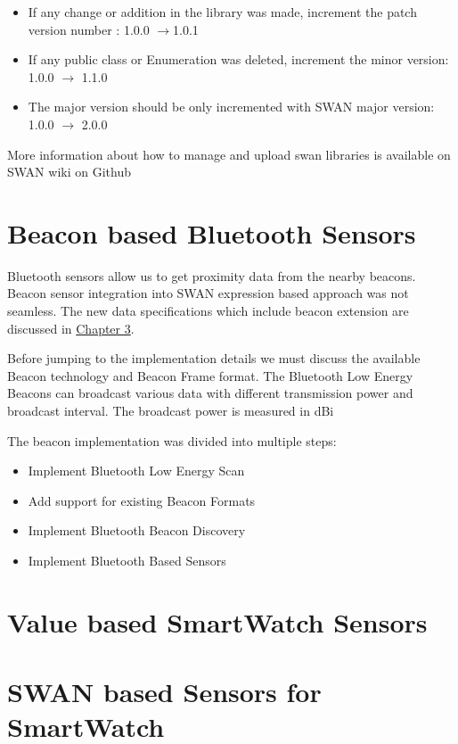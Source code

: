 \begin{itemize}
 \item If any change or addition  in the library was made, increment the patch version number : 1.0.0 $\rightarrow$1.0.1
 \item If any public class or Enumeration was deleted, increment the minor version: 1.0.0 $\rightarrow$ 1.1.0 
 \item The major version should be only incremented with SWAN major version: 1.0.0 $\rightarrow$ 2.0.0
\end{itemize}

More information about how to manage and upload swan libraries is available on SWAN wiki on Github\cite{swanWiki}

\section{Beacon based Bluetooth Sensors}

Bluetooth sensors allow us to get proximity data from the nearby beacons. Beacon sensor integration into SWAN expression based approach was not seamless.
The new data specifications which include beacon extension are discussed in \hyperref[Chapter3]{Chapter 3}.

Before jumping to the implementation details we must discuss the available Beacon technology and Beacon Frame format.
The Bluetooth Low Energy Beacons can broadcast various data with different transmission power and broadcast interval.
The broadcast power is measured in dBi\cite{dbiRef}

The beacon implementation was divided into multiple steps:
\begin{itemize}
 \item Implement Bluetooth Low Energy Scan
 \item Add support for existing Beacon Formats
 \item Implement Bluetooth Beacon Discovery
 \item Implement Bluetooth Based Sensors
\end{itemize}





\section{Value based SmartWatch Sensors}

\section{SWAN based Sensors for SmartWatch}

